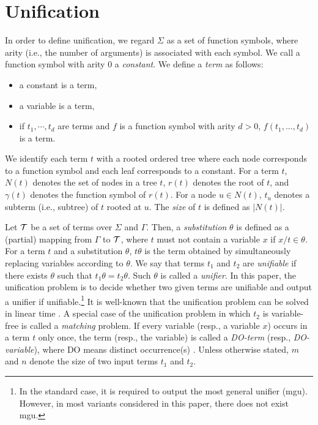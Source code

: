 \documentclass[a4paper]{llncs}
\begin{document}
\section{Unification}

In order to define unification,
we regard $\Sigma$ as a set of function symbols, where 
arity (i.e., the number of arguments) is associated with each symbol.
We call a function symbol with arity 0 a \emph{constant}.
We define a \emph{term} as follows:
\begin{itemize}
\item a constant is a term,
\item a variable is a term,
\item if $t_1,\cdots,t_d$ are terms and
$f$ is a function symbol with arity $d>0$,
$f(t_1,\ldots,t_d)$ is a term.
\end{itemize}
We identify each term $t$ with a rooted ordered tree where
each node corresponds to a function symbol and each leaf
corresponds to a constant.
For a term $t$, $N(t)$ denotes the set of nodes in a tree $t$,
$r(t)$ denotes the root of $t$,
and $\gamma(t)$ denotes the function symbol of $r(t)$.
For a node $u \in N(t)$, $t_u$ denotes a subterm (i.e., subtree)
of $t$ rooted at $u$.
The \emph{size} of $t$ is defined as $|N(t)|$.

Let ${\cal T}$ be a set of terms over $\Sigma$ and $\Gamma$.
Then, a \emph{substitution} $\theta$ is defined as 
a (partial) mapping from $\Gamma$ to ${\cal T}$,
where $t$ must not contain a variable $x$ if $x/t \in \theta$.
For a term $t$ and a substitution $\theta$,
$t \theta$ is the term obtained by simultaneously replacing
variables according to $\theta$.
We say that terms $t_1$ and $t_2$ are \emph{unifiable}
if there exists $\theta$ such that $t_1 \theta = t_2 \theta$.
Such $\theta$ is called a \emph{unifier}.
In this paper, the unification problem is to decide
whether two given terms are unifiable and output a unifier
if unifiable.\footnote{In the standard case, it is required to
output the most general unifier (mgu). However, in most variants
considered in this paper, there does not exist mgu.}
It is well-known that the unification problem can be solved in
linear time \cite{paterson78}.
A special case of the unification problem in which $t_2$ is
variable-free is called a \emph{matching} problem.
If every variable (resp., a variable $x$) occurs in a term $t$ only once,
the term (resp., the variable) is called a \emph{DO-term} (resp.,
\emph{DO-variable}), where DO means distinct occurrence(s) \cite{benanav87}.
Unless otherwise stated, $m$ and $n$ denote the size of two input terms 
$t_1$ and $t_2$.
\end{document}
